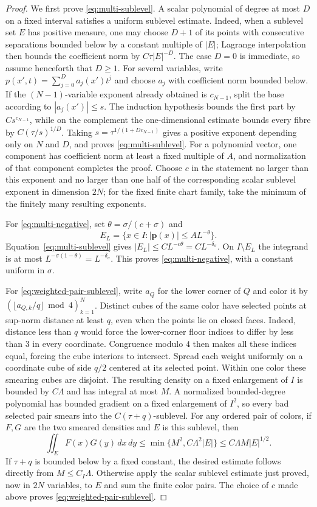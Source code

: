 \documentclass[11pt]{article}
\numberwithin{equation}{section}
\theoremstyle{remark}
\theoremstyle{definition}
\newcommand{\abs}[1]{\lvert #1\rvert}
\begin{document}
\begin{proof}
We first prove \eqref{eq:multi-sublevel}.  A scalar polynomial of degree
at most $D$ on a fixed interval satisfies a uniform sublevel estimate.
Indeed, when a sublevel set $E$ has positive measure, one may choose
$D+1$ of its points with consecutive separations bounded below by a
constant multiple of $|E|$; Lagrange interpolation then bounds the
coefficient norm by $C\tau|E|^{-D}$.  The case $D=0$ is immediate,
so assume henceforth that $D\ge1$.  For several variables, write
$p(x',t)=\sum_{j=0}^D a_j(x')t^j$ and choose $a_j$ with coefficient norm
bounded below.  If the $(N-1)$-variable exponent already obtained is
$c_{N-1}$, split the base according to $|a_j(x')|\le s$.  The induction
hypothesis bounds the first part by $Cs^{c_{N-1}}$, while on the
complement the one-dimensional estimate bounds every fibre by
$C(\tau/s)^{1/D}$.  Taking
$s=\tau^{1/(1+Dc_{N-1})}$ gives a positive exponent depending only on
$N$ and $D$, and proves \eqref{eq:multi-sublevel}.  For a polynomial
vector, one component has coefficient norm at least a fixed multiple of
$A$, and normalization of that component completes the proof.  Choose
$c$ in the statement no larger than this exponent and no larger than one
half of the corresponding scalar sublevel exponent in dimension $2N$;
for the fixed finite chart family, take the minimum of the finitely many
resulting exponents.

For \eqref{eq:multi-negative}, set
$\theta=\sigma/(c+\sigma)$ and
\[
 E_L=\{x\in I:\abs{\mathbf p(x)}\le A L^{-\theta}\}.
\]
Equation~\eqref{eq:multi-sublevel} gives
$|E_L|\le C L^{-c\theta}=C L^{-\delta_\sigma}$.  On
$I\setminus E_L$ the integrand is at most
$L^{-\sigma(1-\theta)}=L^{-\delta_\sigma}$.  This proves
\eqref{eq:multi-negative}, with a constant uniform in $\sigma$.

For \eqref{eq:weighted-pair-sublevel}, write $a_Q$ for the lower corner
of $Q$ and color it by
$(\lfloor a_{Q,k}/q\rfloor\bmod4)_{k=1}^N$.
Distinct cubes of the same color have selected points at sup-norm
distance at least $q$, even when the points lie on closed faces.
Indeed, distance less than $q$ would force the lower-corner floor indices
to differ by less than $3$ in every coordinate.  Congruence modulo $4$
then makes all these indices equal, forcing the cube interiors to
intersect.  Spread each weight uniformly on a coordinate cube of side
$q/2$ centered at its selected point.  Within one color these smearing
cubes are disjoint.  The resulting density on a fixed enlargement of $I$
is bounded by $C\Lambda$ and has integral at most $M$.  A normalized bounded-degree polynomial has bounded gradient on a
fixed enlargement of $I^2$, so every bad selected pair smears into the
$C(\tau+q)$-sublevel.  For any ordered pair of colors, if $F,G$ are the
two smeared densities and $E$ is this sublevel, then
\[
 \iint_EF(x)G(y)\,dx\,dy
 \le\min\{M^2,C\Lambda^2|E|\}
 \le C\Lambda M|E|^{1/2}.
\]
If $\tau+q$ is bounded below by a fixed constant, the desired estimate
follows directly from $M\le C_I\Lambda$.  Otherwise apply the scalar
sublevel estimate just proved, now in $2N$ variables, to $E$ and sum the
finite color pairs.  The choice of
$c$ made above proves \eqref{eq:weighted-pair-sublevel}.


\end{proof}
\end{document}
